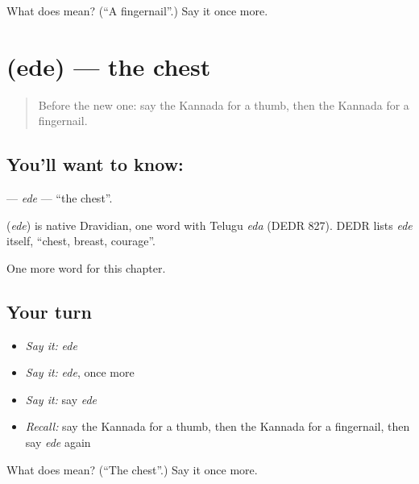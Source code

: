 \begin{tcolorbox}[breakable,colback=teal!4,colframe=teal!35!black,title={Before you move on}]
What does  mean? (\textquotedblleft{}A fingernail\textquotedblright{}.) Say it once more.
\end{tcolorbox}
\section[\texorpdfstring{\kn{ಎದೆ} (ede)}{ಎದೆ (ede)}]{ (ede) — the chest}

\label{lesson:KA-C136-ede}



\begin{quote}
Before the new one: say the Kannada for a thumb, then the Kannada for a fingernail.
\end{quote}

\subsection*{You'll want to know: }
\textbf{} — \emph{ede} — \textquotedblleft{}the chest\textquotedblright{}.

\begin{cousinweb}
\textbf{} (\emph{ede}) is native Dravidian, one word with Telugu \emph{eda} (DEDR 827). DEDR lists \emph{ede} itself, \textquotedblleft{}chest, breast, courage\textquotedblright{}.
\end{cousinweb}

\begin{grammarlens}[title={What you've built}]
One more word for this chapter.
\end{grammarlens}

\subsection*{Your turn}
\begin{itemize}
\raggedright
  \item \emph{Say it:} \emph{ede}
  \item \emph{Say it:} \emph{ede}, once more
  \item \emph{Say it:} say \emph{ede}
  \item \emph{Recall:} say the Kannada for a thumb, then the Kannada for a fingernail, then say \emph{ede} again
\end{itemize}

\begin{tcolorbox}[breakable,colback=teal!4,colframe=teal!35!black,title={Before you move on}]
What does  mean? (\textquotedblleft{}The chest\textquotedblright{}.) Say it once more.
\end{tcolorbox}
